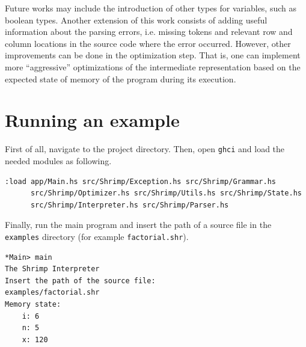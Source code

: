 \documentclass[12pt,a4paper]{article}
\begin{document}
Future works may include the introduction of other types for variables, such as boolean types.
Another extension of this work consists of adding useful information about the parsing errors, i.e. missing tokens and relevant row and column locations in the source code where the error occurred.
However, other improvements can be done in the optimization step.
That is, one can implement more ``aggressive'' optimizations of the intermediate representation based on the expected state of memory of the program during its execution.

\section*{Running an example}
First of all, navigate to the project directory.
Then, open \texttt{ghci} and load the needed modules as following.
\begin{lstlisting}[style=custom-style]
:load app/Main.hs src/Shrimp/Exception.hs src/Shrimp/Grammar.hs
      src/Shrimp/Optimizer.hs src/Shrimp/Utils.hs src/Shrimp/State.hs
      src/Shrimp/Interpreter.hs src/Shrimp/Parser.hs
\end{lstlisting}
Finally, run the main program and insert the path of a source file in the \texttt{examples} directory (for example \texttt{factorial.shr}).
\begin{lstlisting}[style=custom-style]
*Main> main
The Shrimp Interpreter
Insert the path of the source file:
examples/factorial.shr
Memory state:
    i: 6
    n: 5
    x: 120
\end{lstlisting}
\end{document}

